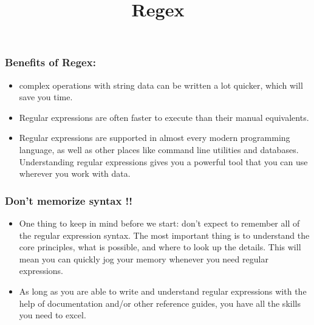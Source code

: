 \documentclass[11pt]{article}
\title{Regex}
\providecommand{\tightlist}{%
      \setlength{\itemsep}{0pt}\setlength{\parskip}{0pt}}
\begin{document}
    
    \maketitle
    
    

    
    \hypertarget{benefits-of-regex}{%
\subsubsection{Benefits of Regex:}\label{benefits-of-regex}}

\begin{itemize}
\tightlist
\item
  complex operations with string data can be written a lot quicker,
  which will save you time.
\item
  Regular expressions are often faster to execute than their manual
  equivalents.
\item
  Regular expressions are supported in almost every modern programming
  language, as well as other places like command line utilities and
  databases. Understanding regular expressions gives you a powerful tool
  that you can use wherever you work with data.
\end{itemize}

    \hypertarget{dont-memorize-syntax}{%
\subsubsection{Don't memorize syntax !!}\label{dont-memorize-syntax}}

\begin{itemize}
\item
  One thing to keep in mind before we start: don't expect to remember
  all of the regular expression syntax. The most important thing is to
  understand the core principles, what is possible, and where to look up
  the details. This will mean you can quickly jog your memory whenever
  you need regular expressions.
\item
  As long as you are able to write and understand regular expressions
  with the help of documentation and/or other reference guides, you have
  all the skills you need to excel.
\end{itemize}
\end{document}
